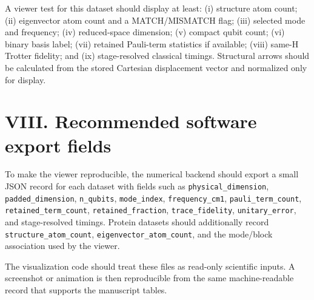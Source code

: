 \documentclass[10pt]{article}
\begin{document}
A viewer test for this dataset should display at least: (i) structure atom count; (ii) eigenvector atom count and a MATCH/MISMATCH flag; (iii) selected mode and frequency; (iv) reduced-space dimension; (v) compact qubit count; (vi) binary basis label; (vii) retained Pauli-term statistics if available; (viii) same-H Trotter fidelity; and (ix) stage-resolved classical timings. Structural arrows should be calculated from the stored Cartesian displacement vector and normalized only for display.

\section*{VIII. Recommended software export fields}
To make the viewer reproducible, the numerical backend should export a small JSON record for each dataset with fields such as \texttt{physical\_dimension}, \texttt{padded\_dimension}, \texttt{n\_qubits}, \texttt{mode\_index}, \texttt{frequency\_cm1}, \texttt{pauli\_term\_count}, \texttt{retained\_term\_count}, \texttt{retained\_fraction}, \texttt{trace\_fidelity}, \texttt{unitary\_error}, and stage-resolved timings. Protein datasets should additionally record \texttt{structure\_atom\_count}, \texttt{eigenvector\_atom\_count}, and the mode/block association used by the viewer.

The visualization code should treat these files as read-only scientific inputs. A screenshot or animation is then reproducible from the same machine-readable record that supports the manuscript tables.
\end{document}
